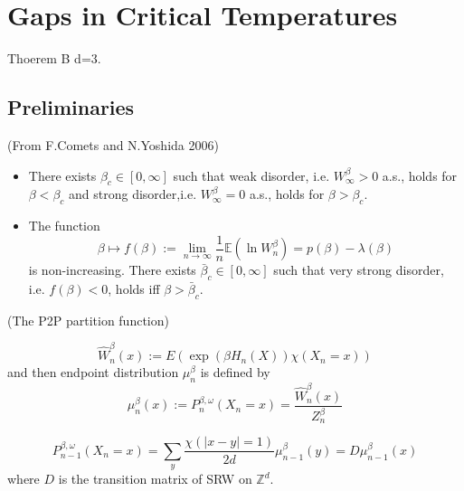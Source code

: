 \section{Gaps in Critical Temperatures}

Thoerem B d=3.

\subsection{Preliminaries}

\begin{theorem}(From F.Comets and N.Yoshida 2006)\par
    \begin{itemize}
        \item There exists $\beta_c \in [0,\infty]$ such that weak disorder, i.e. $W_{\infty}^{\beta} > 0$ a.s., holds for $\beta < \beta_c$ and strong disorder,i.e. $W_{\infty}^{\beta} = 0$ a.s., holds for $\beta > \beta_c$.
        \item The function
        \[\beta\mapsto f(\beta):= \lim_{n\to\infty} \dfrac{1}{n}\mathbb{E}(\ln W_n^{\beta}) = p(\beta) - \lambda(\beta)\]
        is non-increasing. There exists $\bar{\beta}_c \in [0,\infty]$ such that very strong disorder, i.e. $f(\beta) < 0$, holds iff $\beta > \bar{\beta}_c$.
    \end{itemize}
\end{theorem}
\begin{definition}
    (The P2P partition function)\par
    \[
    \widehat{W}^{\beta}_n(x):=E(\exp(\beta H_n(X))\chi({X_n = x}))
    \]
    and then endpoint distribution $\mu_n^{\beta}$ is defined by
    \[
    \mu_n^{\beta}(x):= P^{\beta,\omega}_n(X_n = x) = \dfrac{\widehat{W}^{\beta}_n(x)}{Z^{\beta}_n}
    \]
\end{definition} 

\begin{proposition}
    \[
    P^{\beta,\omega}_{n-1}(X_n = x) = \sum\limits_{y} \dfrac{\chi(|x-y|=1)}{2d}\mu_{n-1}^{\beta}(y) = D\mu_{n-1}^{\beta}(x)
    \]
    where $D$ is the transition matrix of SRW on $\mathbb{Z}^d$.
\end{proposition}

